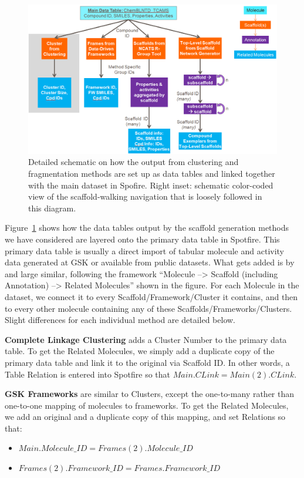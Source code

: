 \documentclass[journal=jacsat,manuscript=article]{achemso}
\newcommand*\fref[1]{Figure~\ref{fig:#1}}
\begin{document}
\begin{figure}
\includegraphics[width=6in]{fig/details_all2.png}
\caption{Detailed schematic on how the output from clustering and fragmentation methods are set up as data tables and linked together with the main dataset in Spofire. Right inset: schematic color-coded view of the scaffold-walking navigation that is loosely followed in this diagram.}
\label{fig:detaildevil}
\end{figure}

\fref{detaildevil} shows how the data tables output by the scaffold generation methods we have considered are layered onto the primary data table in Spotfire. This primary data table is usually a direct import of tabular molecule and activity data generated at GSK or available from public datasets. What gets added is by and large similar, following the framework ``Molecule --> Scaffold (including Annotation) --> Related Molecules'' shown in the figure. For each Molecule in the dataset, we connect it to every Scaffold/Framework/Cluster it contains, and then to every other molecule containing any of these Scaffolds/Frameworks/Clusters. Slight differences for each individual method are detailed below. 

{\bf Complete Linkage Clustering} adds a Cluster Number to the primary data table. To get the Related Molecules, we simply add a duplicate copy of the primary data table and link it to the original via Scaffold ID. In other words, a Table Relation is entered into Spotfire so that $Main.CLink = Main(2).CLink$.  

{\bf GSK Frameworks} are similar to Clusters, except the one-to-many rather than one-to-one mapping of molecules to frameworks. To get the Related Molecules, we add an original and a duplicate copy of this mapping, and set Relations so that:  
\begin{itemize}
\item $Main.Molecule\_ID = Frames(2).Molecule\_ID$
\item $Frames(2).Framework\_ID = Frames.Framework\_ID$
\end{itemize}
\end{document}
